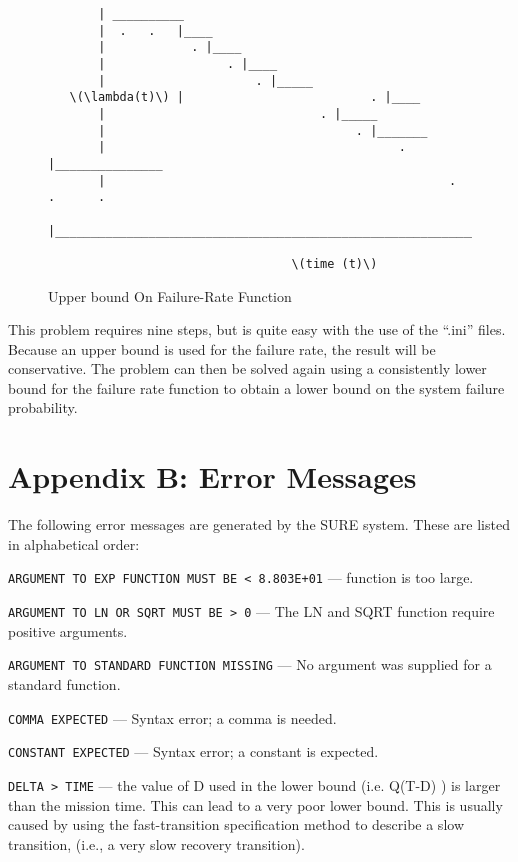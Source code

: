 \begin{figure}
\begin{verbatim}
       | __________  
       |  .   .   |____
       |            . |____
       |                 . |____
       |                     . |_____
   \(\lambda(t)\) |                          . |____
       |                              . |_____
       |                                   . |_______
       |                                         .  |_______________
       |                                                .   .      .
       |________________________________________________________________

                                  \(time (t)\)
\end{verbatim}
\caption{Upper bound On Failure-Rate Function}
\label{dechaz2}
\end{figure}

     This problem requires nine steps, but is quite easy with the use of 
the ``.ini'' files.  Because an upper bound is used for the failure rate,
the result will be conservative.  The problem can then be solved again using
a consistently lower bound for the failure rate function to obtain a 
lower bound on the system failure probability.


\section{Appendix B: Error Messages}



The following error messages are generated by the SURE system.  These are
listed in alphabetical order:

\noindent \verb|ARGUMENT TO EXP FUNCTION MUST BE < 8.803E+01| --- 
function is too large.

\noindent \verb|ARGUMENT TO LN OR SQRT MUST BE > 0| --- 
The LN and SQRT function require positive arguments.

\noindent \verb|ARGUMENT TO STANDARD FUNCTION MISSING| --- 
No argument was supplied for a     standard function.

\noindent \verb|COMMA EXPECTED| --- 
Syntax error; a comma is needed.

\noindent \verb|CONSTANT EXPECTED| --- 
Syntax error; a constant is expected.

\noindent \verb|DELTA > TIME| --- 
the value of D used in the lower bound (i.e. Q(T-D) ) is larger than the
mission time.  This can lead to a very poor lower bound.  This is usually
caused by using the fast-transition specification method to describe a slow
transition, (i.e., a very slow recovery transition).

